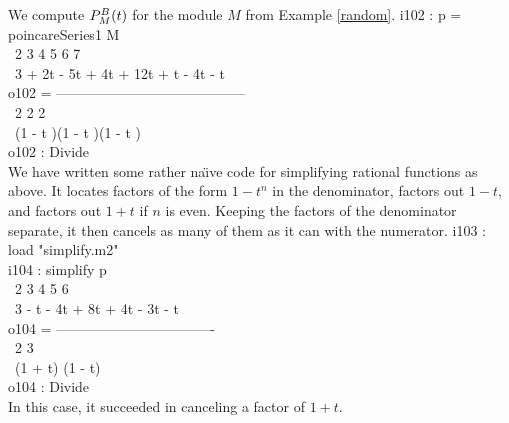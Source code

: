 \begin{sExample}
We compute ${P}^B_M(t)$ for the module $M$ from Example \ref{random}.
\beginOutput
i102 : p = poincareSeries1 M\\
\emptyLine
\                  2     3      4    5     6    7\\
\       3 + 2t - 5t  + 4t  + 12t  + t  - 4t  - t\\
o102 = -----------------------------------------\\
\                      2       2       2\\
\                (1 - t )(1 - t )(1 - t )\\
\emptyLine
o102 : Divide\\
\endOutput
We have written some rather na\"\i ve code for simplifying rational
functions as above.  It locates factors of the form $1-t^n$ in the
denominator, factors out $1-t$, and factors out $1+t$ if $n$ is even.
Keeping the factors of the denominator separate, it then cancels as
many of them as it can with the numerator.
\beginOutput
i103 : load "simplify.m2"\\
\endOutput
\beginOutput
i104 : simplify p\\
\emptyLine
\                 2     3     4     5    6\\
\       3 - t - 4t  + 8t  + 4t  - 3t  - t\\
o104 = ----------------------------------\\
\                       2       3\\
\                (1 + t) (1 - t)\\
\emptyLine
o104 : Divide\\
\endOutput
In this case, it succeeded in canceling a factor of $1+t$.
\end{sExample}

